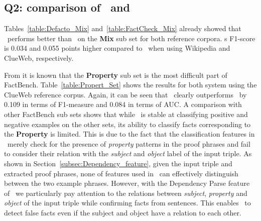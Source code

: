 \subsection{\textbf{Q2:} comparison of \FactCheck\ and \DeFacto}

Tables~\ref{table:Defacto_Mix} and~\ref{table:FactCheck_Mix} already showed that \FactCheck\ performs better than \DeFacto\ on the \textbf{Mix} sub set for both reference corpora. \FactCheck s F1-score is 0.034 and 0.055 points higher compared to \DeFacto\ when using Wikipedia and ClueWeb, respectively.

From \cite{gerber2015defacto} it is known that the \textbf{Property} sub set is the most difficult part of FactBench. Table~\ref{table:Propert_Set} shows the results for both system using the ClueWeb reference corpus. Again, it can be seen that \FactCheck\ clearly outperforms \DeFacto\ by 0.109 in terms of F1-measure and 0.084 in terms of AUC. A comparison with other FactBench sub sets shows that while \DeFacto\ is stable at classifying positive and negative examples on the other sets, its ability to classify facts corresponding to the \textbf{Property} is limited. This is due to the fact that the classification features in \DeFacto\ merely check for the presence of \textit{property} patterns in the proof phrases and fail to consider their relation with the \textit{subject} and \textit{object} label of the input triple. As shown in Section~\ref{subsec:Dependency_feature}, given the input triple and extracted proof phrases, none of features used in \DeFacto\ can effectively distinguish between the two example phrases. However, with the Dependency Parse feature of \FactCheck\ we particularly pay attention to the relations between \textit{subject}, \textit{property} and \textit{object} of the input triple while confirming facts from sentences. This enables \FactCheck\ to detect false facts even if the subject and object have a relation to each other.

